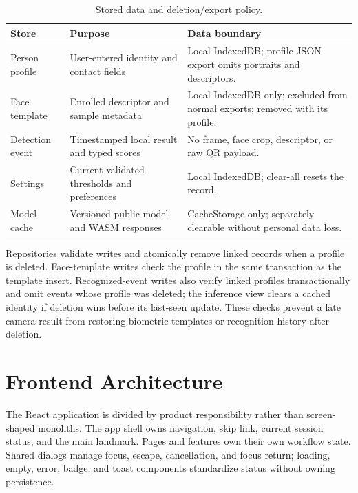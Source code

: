 \documentclass[11pt,oneside,openany]{report}
\begin{document}
\begin{table}[htbp]
\centering
\caption{Stored data and deletion/export policy.}
\begin{tabularx}{\textwidth}{>{\raggedright\arraybackslash}p{}XX}
\toprule
\textbf{Store} & \textbf{Purpose} & \textbf{Data boundary} \\
\midrule
Person profile & User-entered identity and contact fields & Local IndexedDB; profile JSON export omits portraits and descriptors. \\
Face template & Enrolled descriptor and sample metadata & Local IndexedDB only; excluded from normal exports; removed with its profile. \\
Detection event & Timestamped local result and typed scores & No frame, face crop, descriptor, or raw QR payload. \\
Settings & Current validated thresholds and preferences & Local IndexedDB; clear-all resets the record. \\
Model cache & Versioned public model and WASM responses & CacheStorage only; separately clearable without personal data loss. \\
\bottomrule
\end{tabularx}
\end{table}

Repositories validate writes and atomically remove linked records when a profile is deleted. Face-template writes check the profile in the same transaction as the template insert. Recognized-event writes also verify linked profiles transactionally and omit events whose profile was deleted; the inference view clears a cached identity if deletion wins before its last-seen update. These checks prevent a late camera result from restoring biometric templates or recognition history after deletion.

\chapter{Frontend Architecture}
The React application is divided by product responsibility rather than screen-shaped monoliths. The app shell owns navigation, skip link, current session status, and the main landmark. Pages and features own their own workflow state. Shared dialogs manage focus, escape, cancellation, and focus return; loading, empty, error, badge, and toast components standardize status without owning persistence.
\end{document}

